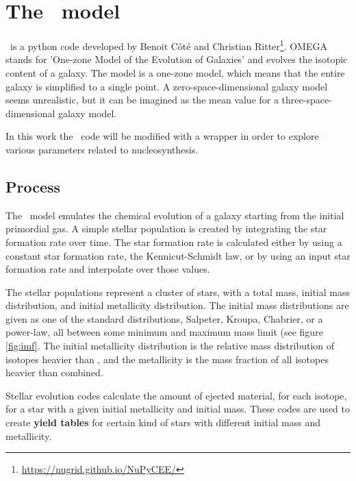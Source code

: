 \section{The \omegamodel\ model}
\label{sec:omega}
\omegamodel\ is a python code developed by Benoit C\^{o}t\'{e} and Christian Ritter\footnote{\url{https://nugrid.github.io/NuPyCEE/}}.
OMEGA stands for 'One-zone Model of the Evolution of Galaxies' and evolves the isotopic content of a galaxy.
The model is a one-zone model, which means that the entire galaxy is simplified to a single point.
A zero-space-dimensional galaxy model seems unrealistic, but it can be imagined as the mean value for a three-space-dimensional galaxy model.



In this work the \omegamodel\ code will be modified with a wrapper in order to explore various parameters related to nucleosynthesis.

\subsection{Process}
\label{sec:omega-process}
The \omegamodel\ model emulates the chemical evolution of a galaxy starting from the initial primordial gas. A simple stellar population is created by integrating the star formation rate over time.
The star formation rate is calculated either by using a constant star formation rate, the Kennicut-Schmidt law, or by using an input star formation rate and interpolate over those values.

The stellar populations represent a cluster of stars, with a total mass, initial mass distribution, and initial metallicity distribution.
The initial mass distributions are given as one of the standard distributions, Salpeter, Kroupa, Chabrier, or a power-law, all between some minimum and maximum mass limit (see figure \ref{fig:imf}.
The initial metallicity distribution is the relative mass distribution of isotopes heavier than , and the metallicity is the mass fraction of all isotopes heavier than  combined.


Stellar evolution codes calculate the amount of ejected material, for each isotope, for a star with a given initial metallicity and initial mass. These codes are used to create \textbf{yield tables} for certain kind of stars with different initial mass and metallicity.

